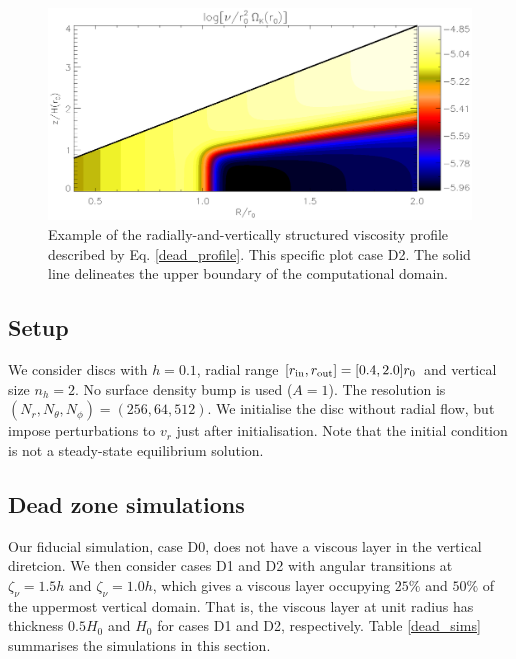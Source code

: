 \begin{figure}
  \centering
  \includegraphics[width=\linewidth]{figures/pdisk_visc2d_dead}
  \caption{Example of the radially-and-vertically structured viscosity
    profile described by Eq. \ref{dead_profile}. 
    This specific plot case D2. The solid line delineates the upper
    boundary of the computational domain. 
    \label{visc2d_dead}}
\end{figure}

\subsection{Setup}
We consider discs with $h=0.1$, radial range
$[r_\mathrm{in},r_\mathrm{out}]=[0.4,2.0]r_0$ and vertical size $n_h=2$. No surface
density bump is used ($A=1$). The resolution
is $(N_r,N_\theta,N_\phi)=(256,64,512)$. We initialise the disc
without radial flow, but impose perturbations to $v_r$ just after
initialisation. Note that the initial condition is not a steady-state
equilibrium solution.   

\subsection{Dead zone simulations}
Our fiducial simulation, case D0, does not have a viscous layer in the
vertical diretcion. We then consider cases D1 
and D2 with angular transitions at $\zeta_\nu=1.5h$ and
$\zeta_\nu=1.0h$, which gives a viscous layer occupying
$25\%$ and $50\%$ of the uppermost vertical domain. That is, the 
viscous layer at unit radius has thickness $0.5H_0$ and $H_0$ for
cases D1 and D2, respectively. Table \ref{dead_sims} summarises the
simulations in this section. 
 
